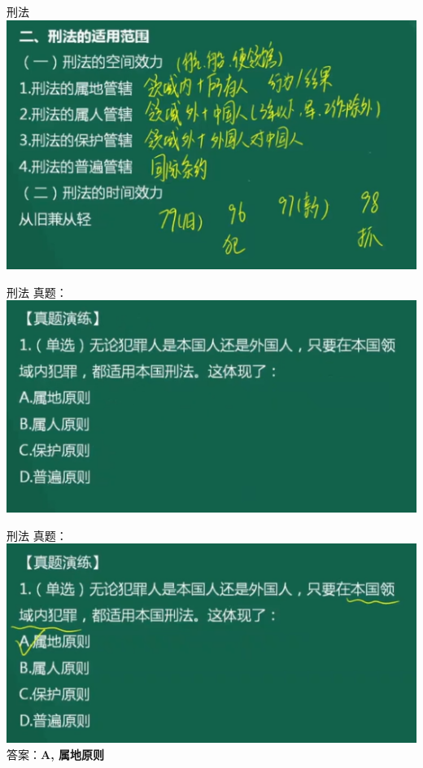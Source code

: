 \documentclass[aspectratio=169]{beamer}
\begin{document}
\begin{frame}[t]{刑法}
    \includegraphics[scale=0.4]{criminal_law_range}\\ 
\end{frame}


\begin{frame}[t]{刑法}
    真题：\\
    \includegraphics[scale=0.4]{criminal_law_003}\\ 
\end{frame}


\begin{frame}[t]{刑法}
    真题：\\
    \includegraphics[scale=0.4]{criminal_law_003A}\\ 

    答案：\textbf{A, 属地原则}\\
\end{frame}
\end{document}
